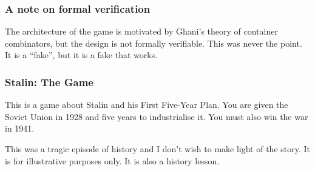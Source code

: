 \documentclass[aspectratio=169,12pt]{beamer}
\begin{document}
\begin{frame}
\frametitle{A note on formal verification}
\vfill
\begin{center}
\begin{minipage}{0.92\textwidth}
\raggedright
\large

The architecture of the game is motivated by Ghani's theory of container combinators, but the
design is not formally verifiable. This was never the point. It is a ``fake'', but it is a fake
that works.

\end{minipage}
\end{center}
\vfill
\end{frame}

\begin{frame}
\frametitle{Stalin: The Game}
\vfill
\begin{center}
\begin{minipage}{0.92\textwidth}
\raggedright
\large

This is a game about Stalin and his First Five-Year Plan. You are given the Soviet Union in 1928
and five years to industrialise it. You must also win the war in 1941.

\medskip

This was a tragic episode of history and I don't wish to make light of the story. It is for
illustrative purposes only. It is also a history lesson.

\end{minipage}
\end{center}
\vfill
\end{frame}
\end{document}
